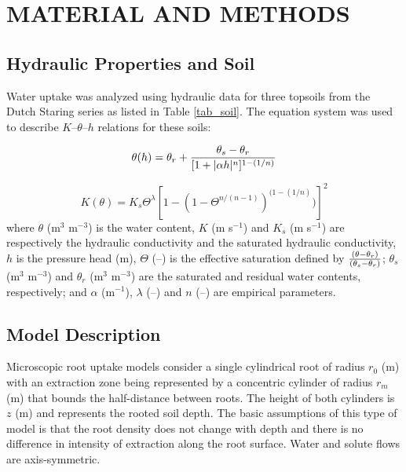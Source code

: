 \def\clim{$C_{lim}$}
\def\c2{$C_2$}
\def\uwc{(m$^3$ m$^{-3}$) }
\def\uhead{(m) }

\section*{MATERIAL AND METHODS}

\subsection*{Hydraulic Properties and Soil}

Water uptake was analyzed using hydraulic data for three topsoils from the Dutch Staring series \citep{wosten} as listed in Table \ref{tab_soil}.
The \cite{genuchten80} equation system was used to describe $K$--$\theta$--$h$ relations for these soils:

\begin{equation}
\label{eq_theta}
\theta(h) = \theta_r + {\theta_s-\theta_r \over [1+|\alpha h|^n]^{1-(1/n)}}
\end{equation}

\begin{equation}
\label{eq_K}
K(\theta) = K_{s} \Theta^\lambda [1-(1-\Theta^{n/(n-1)})^{(1-(1/n)})]^2 
\end{equation}
%
where $\theta$ \uwc is the water content, $K$ (m s$^{-1}$) and $K_s$ (m s$^{-1}$) are respectively the hydraulic conductivity and the saturated hydraulic conductivity, $h$ is the pressure head (m), $\Theta$ (--) is the effective saturation defined by ${(\theta - \theta_r) \over (\theta_s-\theta_r)}$; $\theta_s$ \uwc and $\theta_r$ \uwc are the saturated and residual water contents, respectively; and $\alpha$ (m$^{-1}$), $\lambda$ (--) and $n$ (--) are empirical parameters.





\subsection*{Model Description}

Microscopic root uptake models consider a single cylindrical root of radius $r_0$ \uhead with an extraction zone being represented by a concentric cylinder of radius $r_m$ (m) that bounds the half-distance between roots. The height of both cylinders is $z$ \uhead and represents the rooted soil depth. 
The basic assumptions of this type of model is that the root density does not change with depth and there is no difference in intensity of extraction along the root surface. 
Water and solute flows are axis-symmetric.

